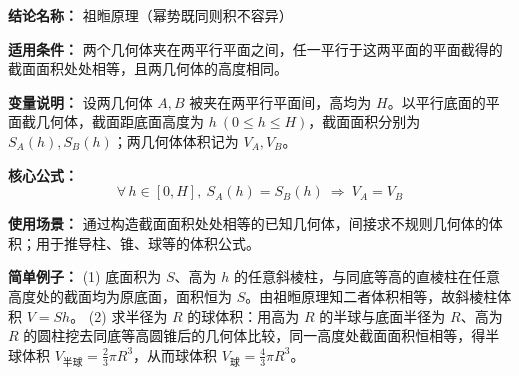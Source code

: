\textbf{结论名称：} 祖暅原理（幂势既同则积不容异）

\textbf{适用条件：} 两个几何体夹在两平行平面之间，任一平行于这两平面的平面截得的截面面积处处相等，且两几何体的高度相同。

\textbf{变量说明：} 设两几何体 $A,B$ 被夹在两平行平面间，高均为 $H$。以平行底面的平面截几何体，截面距底面高度为 $h\ (0\le h\le H)$，截面面积分别为 $S_A(h),S_B(h)$；两几何体体积记为 $V_A,V_B$。

\textbf{核心公式：} 
\[
\boxed{\forall\, h\in[0,H],\ S_A(h)=S_B(h) \ \Longrightarrow\ V_A=V_B}
\]

\textbf{使用场景：} 通过构造截面面积处处相等的已知几何体，间接求不规则几何体的体积；用于推导柱、锥、球等的体积公式。

\textbf{简单例子：} 
(1) 底面积为 $S$、高为 $h$ 的任意斜棱柱，与同底等高的直棱柱在任意高度处的截面均为原底面，面积恒为 $S$。由祖暅原理知二者体积相等，故斜棱柱体积 $V=Sh$。
(2) 求半径为 $R$ 的球体积：用高为 $R$ 的半球与底面半径为 $R$、高为 $R$ 的圆柱挖去同底等高圆锥后的几何体比较，同一高度处截面面积恒相等，得半球体积 $V_{\text{半球}}=\frac{2}{3}\pi R^3$，从而球体积 $V_{\text{球}}=\frac{4}{3}\pi R^3$。